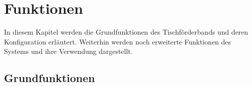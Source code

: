 %
%

\chapter{Funktionen}
\label{sec:Funktionen}
In diesem Kapitel werden die Grundfunktionen des Tischförderbands und deren Konfiguration erläutert.
Weiterhin werden noch erweiterte Funktionen des Systems und ihre Verwendung dargestellt.

\section{Grundfunktionen}

